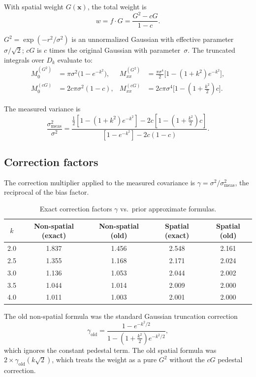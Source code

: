 \documentclass[11pt]{article}
\newcommand{\vect}[1]{\mathbf{#1}}
\begin{document}
With spatial weight $G(\vect{x})$, the total weight is
\begin{equation}
  w = f \cdot G = \frac{G^2 - cG}{1-c}.
\end{equation}

$G^2 = \exp(-r^2/\sigma^2)$ is an unnormalized Gaussian with effective
parameter $\sigma/\sqrt{2}$; $cG$ is $c$ times the original Gaussian with
parameter~$\sigma$. The truncated integrals over $D_k$ evaluate to:
\begin{align}
  M_0^{(G^2)} &= \pi\sigma^2\bigl(1 - e^{-k^2}\bigr), &
  M_{xx}^{(G^2)} &= \frac{\pi\sigma^4}{2}\bigl[1 - (1+k^2)e^{-k^2}\bigr], \\[4pt]
  M_0^{(cG)} &= 2c\pi\sigma^2(1 - c), &
  M_{xx}^{(cG)} &= 2c\pi\sigma^4\bigl[1 - (1+\tfrac{k^2}{2})c\bigr].
\end{align}

The measured variance is
\begin{equation}\label{eq:spatial}
  \boxed{
  \frac{\sigma^2_\text{meas}}{\sigma^2}
  = \frac{\frac{1}{2}[1-(1+k^2)e^{-k^2}] - 2c[1-(1+\frac{k^2}{2})c]}
         {[1-e^{-k^2}] - 2c(1-c)}.
  }
\end{equation}

\subsection{Correction factors}

The correction multiplier applied to the measured covariance is
$\gamma = \sigma^2/\sigma^2_\text{meas}$, the reciprocal of the bias factor.

\begin{table}[h]
\centering
\caption{Exact correction factors $\gamma$ vs.\ prior approximate formulas.}
\label{tab:corrections}
\begin{tabular}{@{}ccccc@{}}
\toprule
$k$ & Non-spatial (exact) & Non-spatial (old) & Spatial (exact) & Spatial (old) \\
\midrule
2.0 & 1.837 & 1.456 & 2.548 & 2.161 \\
2.5 & 1.355 & 1.168 & 2.171 & 2.024 \\
3.0 & 1.136 & 1.053 & 2.044 & 2.002 \\
3.5 & 1.044 & 1.014 & 2.009 & 2.000 \\
4.0 & 1.011 & 1.003 & 2.001 & 2.000 \\
\bottomrule
\end{tabular}
\end{table}

The old non-spatial formula was the standard Gaussian truncation correction
\begin{equation}
  \gamma_\text{old} = \frac{1 - e^{-k^2/2}}{1 - (1+\tfrac{k^2}{2})e^{-k^2/2}},
\end{equation}
which ignores the constant pedestal term. The old spatial formula was
$2 \times \gamma_\text{old}(k\sqrt{2})$, which treats the weight as a pure
$G^2$ without the $cG$ pedestal correction.
\end{document}
